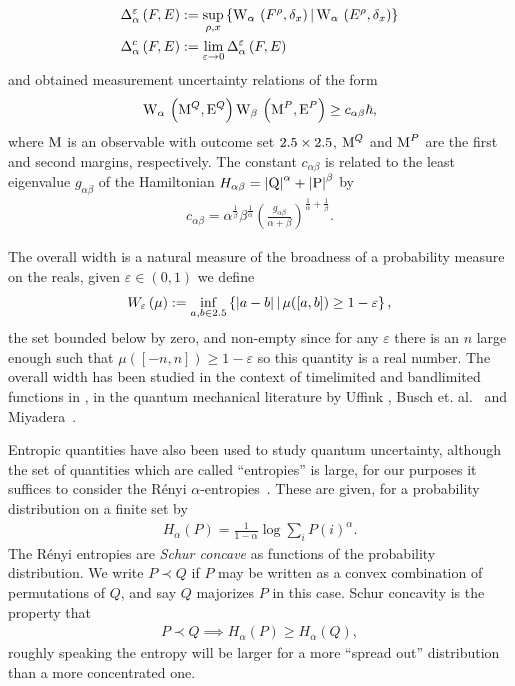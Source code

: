 \begin{align}
  \calibError{F}{E}{\alpha}[\varepsilon] &\defeq \sup_{\rho,x} \sbuild{\ws{F^\rho,\delta_{x}}[\alpha]}{\ws{E^\rho,\delta_{x}}[\alpha]}\\
  \calibError{F}{E}{\alpha} &\defeq \lim_{\varepsilon\to 0} \calibError{F}{E}{\alpha}[\varepsilon]  
\end{align}
and obtained measurement uncertainty relations of the form 
\begin{align}
  \ws{\opm^Q, \ope^Q}[\alpha]\ws{\opm^P, \ope^P}[\beta] \geq c_{\alpha\beta} \hbar,
\end{align}
where $\operatorname{M}$ is an observable with outcome set $2.5\times2.5$, $\operatorname{M}^Q$ and $\operatorname{M}^P$ are the first and second margins, respectively. The constant $c_{\alpha\beta}$ is related to the least eigenvalue $g_{\alpha\beta}$ of the Hamiltonian $H_{\alpha\beta} = {\left\lvert{\operatorname{Q}}\right\rvert}^\alpha + {\left\lvert{\operatorname{P}}\right\rvert}^\beta$ by 
\begin{align}
  c_{\alpha\beta} = \alpha^{\frac{1}{\beta}} \beta^{\frac{1}{\alpha}} \left(\frac{g_{\alpha\beta}}{\alpha+\beta}\right)^{\frac{1}{\alpha} + \frac{1}{\beta}}.
\end{align}

The overall width is a natural measure of the broadness of a probability measure on the reals, given $\varepsilon\in (0,1)$ we define
\begin{align}
  W_{\varepsilon}\left({\mu}\right) := \inf_{a,b\in2.5} \left\{{\left\lvert{a-b}\right\rvert}\,\middle|\,\mu([a,b])\geq 1-\varepsilon\right\}, \label{eqn:overall-width-defn}
\end{align}
the set bounded below by zero, and non-empty since for any $\varepsilon$ there is an $n$ large enough such that $\mu([-n,n])\geq 1-\varepsilon$ so this quantity is a real number. The overall width has been studied in the context of timelimited and bandlimited functions in \cite{6773660}, in the quantum mechanical literature by Uffink \cite{ufink-thesis}, Busch et. al.~\cite{BUSCH2007155} and Miyadera~\cite{doi:10.1063/1.3614503}.

Entropic quantities have also been used to study quantum uncertainty, although the set of quantities which are called ``entropies'' is large, for our purposes it suffices to consider the R\'enyi $\alpha$-entropies~\cite{renyi1961}. These are given, for a probability distribution on a finite set by
\begin{align}
  H_\alpha(P) = \frac{1}{1-\alpha} \log{\sum_i P(i)^\alpha}.
\end{align}
The R\'enyi entropies are \emph{Schur concave} as functions of the probability distribution. We write $P \prec Q$ if $P$ may be written as a convex combination of permutations of $Q$, and say $Q$ majorizes $P$ in this case. Schur concavity is the property that
\begin{align}
  P\prec Q \implies H_\alpha(P) \geq H_\alpha(Q),
\end{align}
roughly speaking the entropy will be larger for a more ``spread out'' distribution than a more concentrated one.

